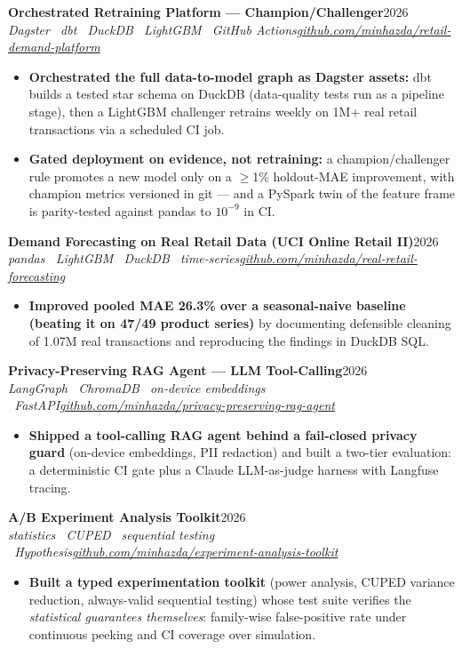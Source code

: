 \documentclass[10pt,a4paper]{article}
\newcommand{\entry}[4]{%
  \textbf{#1}\hfill{\color{muted}\small #2}\\[1pt]
  {\color{accent}\itshape #3}\hfill{\color{muted}\itshape\small #4}\par\vspace{2pt}}
\begin{document}
\entry{Orchestrated Retraining Platform --- Champion/Challenger}{2026}{Dagster \textperiodcentered\ dbt \textperiodcentered\ DuckDB \textperiodcentered\ LightGBM \textperiodcentered\ GitHub Actions}{\href{https://github.com/minhazda/retail-demand-platform}{github.com/minhazda/retail-demand-platform}}
\begin{itemize}
  \item \textbf{Orchestrated the full data-to-model graph as Dagster assets:} dbt builds a tested star schema on DuckDB (data-quality tests run as a pipeline stage), then a LightGBM challenger retrains weekly on 1M+ real retail transactions via a scheduled CI job.
  \item \textbf{Gated deployment on evidence, not retraining:} a champion/challenger rule promotes a new model only on a $\geq$1\% holdout-MAE improvement, with champion metrics versioned in git --- and a PySpark twin of the feature frame is parity-tested against pandas to $10^{-9}$ in CI.
\end{itemize}

\entry{Demand Forecasting on Real Retail Data (UCI Online Retail II)}{2026}{pandas \textperiodcentered\ LightGBM \textperiodcentered\ DuckDB \textperiodcentered\ time-series}{\href{https://github.com/minhazda/real-retail-forecasting}{github.com/minhazda/real-retail-forecasting}}
\begin{itemize}
  \item \textbf{Improved pooled MAE 26.3\% over a seasonal-naive baseline (beating it on 47/49 product series)} by documenting defensible cleaning of 1.07M real transactions and reproducing the findings in DuckDB SQL.
\end{itemize}

\entry{Privacy-Preserving RAG Agent --- LLM Tool-Calling}{2026}{LangGraph \textperiodcentered\ ChromaDB \textperiodcentered\ on-device embeddings \textperiodcentered\ FastAPI}{\href{https://github.com/minhazda/privacy-preserving-rag-agent}{github.com/minhazda/privacy-preserving-rag-agent}}
\begin{itemize}
  \item \textbf{Shipped a tool-calling RAG agent behind a fail-closed privacy guard} (on-device embeddings, PII redaction) and built a two-tier evaluation: a deterministic CI gate plus a Claude LLM-as-judge harness with Langfuse tracing.
\end{itemize}

\entry{A/B Experiment Analysis Toolkit}{2026}{statistics \textperiodcentered\ CUPED \textperiodcentered\ sequential testing \textperiodcentered\ Hypothesis}{\href{https://github.com/minhazda/experiment-analysis-toolkit}{github.com/minhazda/experiment-analysis-toolkit}}
\begin{itemize}
  \item \textbf{Built a typed experimentation toolkit} (power analysis, CUPED variance reduction, always-valid sequential testing) whose test suite verifies the \emph{statistical guarantees themselves}: family-wise false-positive rate under continuous peeking and CI coverage over simulation.
\end{itemize}
\end{document}
